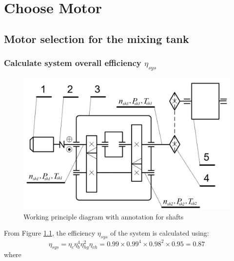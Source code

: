 \chapter{Choose Motor}

\section{Motor selection for the mixing tank}
\subsection{Calculate system overall efficiency $ \eta_{sys} $} 
\begin{figure}[ht]
	\centering
	\includegraphics[width=0.75\linewidth]{images/problem2}
	\caption{Working principle diagram with annotation for shafts}
	\label{fig:problem2}
\end{figure}
From Figure \ref{fig:problem2}, the efficiency $ \eta_{sys} $ of the system is calculated using:
\[\eta_{sys} = \eta_c\eta_b^4\eta_{hg}^2\eta_{ch} = 0.99 \times 0.99^4 \times 0.98^2 \times 0.95 = 0.87\]
where
